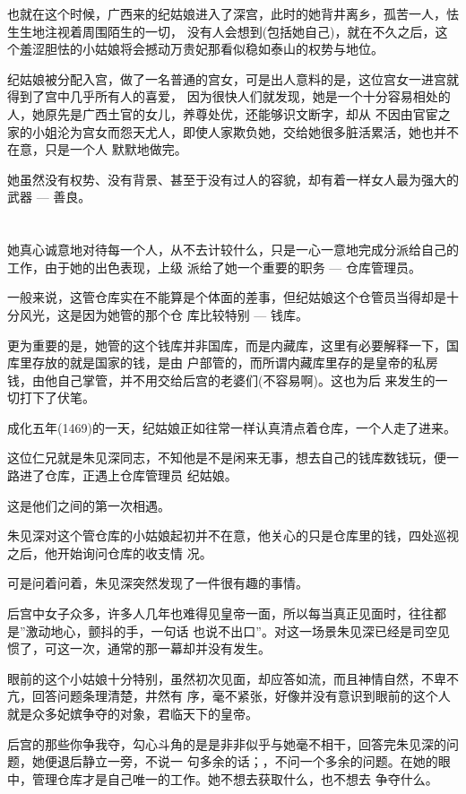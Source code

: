 \documentclass[11pt,a4paper,onecolumn]{article}
\begin{document}
也就在这个时候，广西来的纪姑娘进入了深宫，此时的她背井离乡，孤苦一人，怯生生地注视着周围陌生的一切，
没有人会想到(包括她自己)，就在不久之后，这个羞涩胆怯的小姑娘将会撼动万贵妃那看似稳如泰山的权势与地位。

纪姑娘被分配入宫，做了一名普通的宫女，可是出人意料的是，这位宫女一进宫就得到了宫中几乎所有人的喜爱，
因为很快人们就发现，她是一个十分容易相处的人，她原先是广西土官的女儿，养尊处优，还能够识文断字，却从
不因由官宦之家的小姐沦为宫女而怨天尤人，即使人家欺负她，交给她很多脏活累活，她也并不在意，只是一个人
默默地做完。

她虽然没有权势、没有背景、甚至于没有过人的容貌，却有着一样女人最为强大的武器 --- 善良。

\section[\thesection]{}

她真心诚意地对待每一个人，从不去计较什么，只是一心一意地完成分派给自己的工作，由于她的出色表现，上级
派给了她一个重要的职务 --- 仓库管理员。

一般来说，这管仓库实在不能算是个体面的差事，但纪姑娘这个仓管员当得却是十分风光，这是因为她管的那个仓
库比较特别 --- 钱库。

更为重要的是，她管的这个钱库并非国库，而是内藏库，这里有必要解释一下，国库里存放的就是国家的钱，是由
户部管的，而所谓内藏库里存的是皇帝的私房钱，由他自己掌管，并不用交给后宫的老婆们(不容易啊)。这也为后
来发生的一切打下了伏笔。

成化五年(1469)的一天，纪姑娘正如往常一样认真清点着仓库，一个人走了进来。

这位仁兄就是朱见深同志，不知他是不是闲来无事，想去自己的钱库数钱玩，便一路进了仓库，正遇上仓库管理员
纪姑娘。

这是他们之间的第一次相遇。

朱见深对这个管仓库的小姑娘起初并不在意，他关心的只是仓库里的钱，四处巡视之后，他开始询问仓库的收支情
况。

可是问着问着，朱见深突然发现了一件很有趣的事情。

后宫中女子众多，许多人几年也难得见皇帝一面，所以每当真正见面时，往往都是''激动地心，颤抖的手，一句话
也说不出口''。对这一场景朱见深已经是司空见惯了，可这一次，通常的那一幕却并没有发生。

眼前的这个小姑娘十分特别，虽然初次见面，却应答如流，而且神情自然，不卑不亢，回答问题条理清楚，井然有
序，毫不紧张，好像并没有意识到眼前的这个人就是众多妃嫔争夺的对象，君临天下的皇帝。

后宫的那些你争我夺，勾心斗角的是是非非似乎与她毫不相干，回答完朱见深的问题，她便退后静立一旁，不说一
句多余的话；，不问一个多余的问题。在她的眼中，管理仓库才是自己唯一的工作。她不想去获取什么，也不想去
争夺什么。
\end{document}
